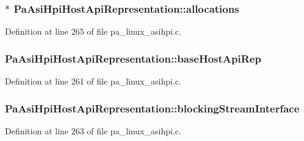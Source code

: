 \subsubsection[{\texorpdfstring{allocations}{allocations}}]{$\ast$ Pa\+Asi\+Hpi\+Host\+Api\+Representation\+::allocations}\hypertarget{struct_pa_asi_hpi_host_api_representation_a5ee6781a5d05f97533f06a92cef72dc6}{}\label{struct_pa_asi_hpi_host_api_representation_a5ee6781a5d05f97533f06a92cef72dc6}


Definition at line 265 of file pa\+\_\+linux\+\_\+asihpi.\+c.

\subsubsection[{\texorpdfstring{base\+Host\+Api\+Rep}{baseHostApiRep}}]{ Pa\+Asi\+Hpi\+Host\+Api\+Representation\+::base\+Host\+Api\+Rep}\hypertarget{struct_pa_asi_hpi_host_api_representation_a17c8f54b933c0d8c50007e1a40bd5acf}{}\label{struct_pa_asi_hpi_host_api_representation_a17c8f54b933c0d8c50007e1a40bd5acf}


Definition at line 261 of file pa\+\_\+linux\+\_\+asihpi.\+c.

\subsubsection[{\texorpdfstring{blocking\+Stream\+Interface}{blockingStreamInterface}}]{ Pa\+Asi\+Hpi\+Host\+Api\+Representation\+::blocking\+Stream\+Interface}\hypertarget{struct_pa_asi_hpi_host_api_representation_a42f33f2e149240f040e17cdc8ec98104}{}\label{struct_pa_asi_hpi_host_api_representation_a42f33f2e149240f040e17cdc8ec98104}


Definition at line 263 of file pa\+\_\+linux\+\_\+asihpi.\+c.

